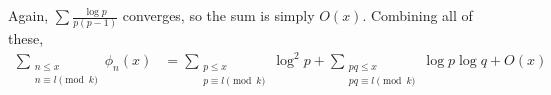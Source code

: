 \documentclass[elemannt.tex]{subfile}
\begin{document}
	Again, $\sum\frac{\log{p}}{p(p-1)}$ converges, so the sum is simply $O(x)$. Combining all of these,
		\begin{align*}
			\sum_{\substack{n\leq x\\n\equiv l\pmod{k}}}\phi_{n}(x)
				& = \sum_{\substack{p\leq x\\p\equiv l\pmod{k}}}\log^{2}{p}+\sum_{\substack{pq\leq x\\pq\equiv l\pmod{k}}}\log{p}{\log{q}}+O(x)
		\end{align*}
\end{document}
